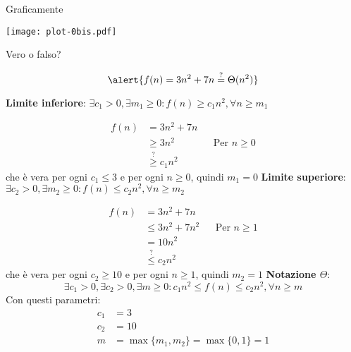 \begin{frame}{Graficamente}

\begin{center}
\vspace{-12pt}
\texttt{[image: plot-0bis.pdf]}
\end{center}

\end{frame}


\begin{frame}{Vero o falso?}

\begin{exampleblock}{}
\[ 
  \alert{f(n) = 3 n^2 + 7n \stackrel{?}{=} \Theta(n^2)}  
\]
\end{exampleblock}

\begin{overprint}
\textbf{Limite inferiore}: $\exists c_1>0, \exists m_1 \geq 0: f(n) \geq c_1n^2, \forall n \geq m_1$

\begin{align*}
f(n) &= 3n^2 + 7n \\
     &\geq 3n^2 && \text{Per $n \geq 0$} \\
     &\stackrel{?}{\geq} c_1n^2
\end{align*}
che è vera per ogni $c_1 \leq 3$ e per ogni $n \geq 0$, quindi $m_1=0$
\textbf{Limite superiore}: $\exists c_2>0, \exists m_2 \geq 0: f(n) \leq c_2n^2, \forall n \geq m_2$

\begin{align*}
f(n) &=    3n^2 + 7n \\
     &\leq 3n^2 + 7n^2 && \text{Per $n \geq 1$}\\
     &=    10n^2 \\
     &\stackrel{?}{\leq} c_2n^2
\end{align*}
che è vera per ogni $c_2 \geq 10$ e per ogni $n \geq 1$, quindi $m_2=1$
\textbf{Notazione $\Theta$}: \[
\exists c_1>0, \exists c_2>0, \exists m \geq 0:  c_1 n^2 \leq f(n) \leq c_2n^2, \forall n \geq m
\]
Con questi parametri:
\begin{align*}
c_1 &= 3 \\
c_2 &= 10 \\
m &= \max \{ m_1, m_2 \} = \max \{ 0, 1 \} = 1
\end{align*}

\end{overprint}

\end{frame}

